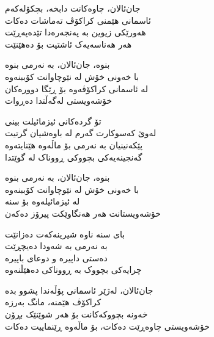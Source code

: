 \begin{lyrics}[12em]

\begin{Arabic}
جان‌ئالان، چاوەکانت دابخە، بچکۆلەکەم\\
ئاسمانی هێمنی کراکۆڤ تەماشات دەکات\\
هەورێکی زیوین بە پەنجەرەدا تێدەپەڕێت\\
هەر هەناسەیەک ئاشتیت بۆ دەهێنێت
\end{Arabic}

\begin{Arabic}
بنوە، جان‌ئالان، بە نەرمی بنوە\\
با خەونی خۆش لە نێوچاوانت کۆببنەوە\\
لە ئاسمانی کراکۆڤەوە بۆ ڕێگا دوورەکان\\
خۆشەویستی لەگەڵتدا دەڕوات
\end{Arabic}

\begin{Arabic}
تۆ گردەکانی ئیزمائیلت بینی\\
لەوێ کەسوکارت گەرم لە باوەشیان گرتیت\\
پێکەنینیان بە نەرمی بۆ ماڵەوە هێنایتەوە\\
گەنجینەیەکی بچووکی ڕووناک لە گوێتدا
\end{Arabic}

\begin{Arabic}
بنوە، جان‌ئالان، بە نەرمی بنوە\\
با خەونی خۆش لە نێوچاوانت کۆببنەوە\\
لە ئیزمائیلەوە بۆ سنە\\
خۆشەویستانت هەر هەنگاوێکت پیرۆز دەکەن
\end{Arabic}

\begin{Arabic}
بای سنە ناوە شیرینەکەت دەزانێت\\
بە نەرمی بە شەودا دەیچڕێت\\
دەستی داپیرە و دوعای باپیرە\\
چرایەکی بچووک بە ڕووناکی دەهێڵنەوە
\end{Arabic}

\begin{Arabic}
جان‌ئالان، لەژێر ئاسمانی پۆڵەندا پشوو بدە\\
کراکۆڤ هێمنە، مانگ بەرزە\\
خەونە بچووکەکانت بۆ هەر شوێنێک بڕۆن\\
خۆشەویستی چاوەڕێت دەکات، بۆ ماڵەوە ڕێنماییت دەکات
\end{Arabic}

\end{lyrics}

